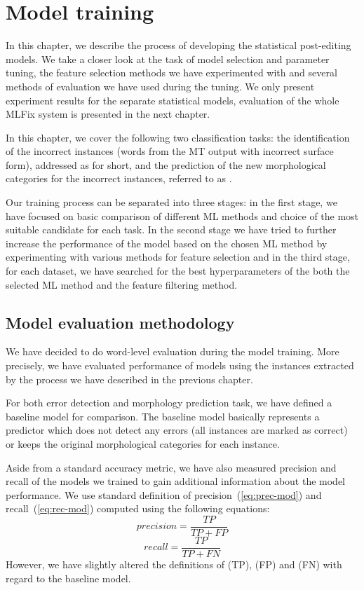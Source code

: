 \chapter{Model training}
\label{chap:tuning}

In this chapter, we describe the process of developing
the statistical post-editing models. We take a closer look at the task of model
selection and parameter tuning, the feature selection methods we have experimented
with and several methods of evaluation we have used during the tuning.
We only present experiment results for the separate statistical models,
evaluation of the whole MLFix system is presented in the next chapter.

In this chapter, we cover the following two classification tasks: the identification
of the incorrect instances (words from the MT output with incorrect surface form),
addressed as  for short,
and the prediction of the new morphological categories for the incorrect instances,
referred to as .

Our training process can be separated into three stages: in the first stage, we
have focused on basic comparison of different ML methods and choice of the most
suitable candidate for each task.
In the second stage we have tried to further increase the performance of the model
based on the chosen ML method by experimenting with various methods for feature selection
and in the third stage, for each dataset, we have searched for the best hyperparameters
of the both the selected ML method and the feature filtering method.

\section{Model evaluation methodology}

We have decided to do word-level evaluation during the model training. More precisely,
we have evaluated performance of models using the instances extracted by the
process we have described in the previous chapter.

For both error detection and morphology prediction task, we have defined
a baseline model for comparison. The baseline model basically represents a predictor which
does not detect any errors (all instances are marked as correct) or keeps the original
morphological categories for each instance.

Aside from a standard accuracy metric, we have also measured
precision and recall
of the models we trained to gain additional information about the model performance.
We use standard definition of precision~(\ref{eq:prec-mod}) and recall~(\ref{eq:rec-mod}) computed using the following equations:
\begin{equation} \label{eq:prec-mod}
precision = \frac{TP}{TP + FP}
\end{equation}
\begin{equation} \label{eq:rec-mod}
recall = \frac{TP}{TP + FN}
\end{equation}
However, we have slightly altered the definitions of  (TP),
 (FP) and  (FN)
with regard to the baseline model.

